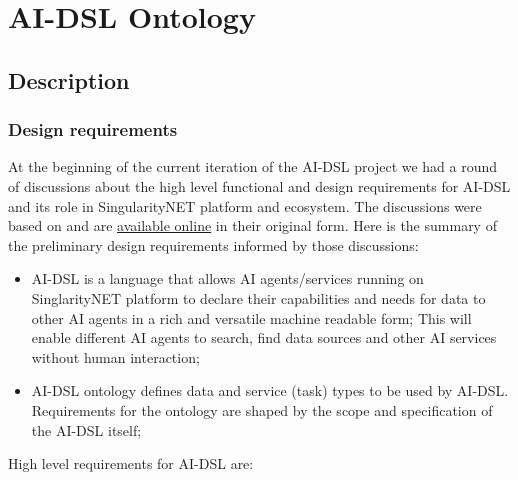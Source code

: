 \documentclass[]{report}
\begin{document}
\chapter{AI-DSL Ontology}
\label{chap:aidsl_ontology}

\section{Description}

\subsection{Design requirements}
\label{sec:design-requirements}

At the beginning of the current iteration of the AI-DSL project we had a round
of discussions about the high level functional and design requirements for
AI-DSL and its role in SingularityNET platform and ecosystem. The discussions
were based on
\cite{GoertzelGeisweillerBlog,singularitynet_foundation_phasetwo_2021}  and are
\href{https://github.com/nunet-io/ai-dsl-ontology/wiki/AI-DSL\%20requirements}{available
online} in their original form. Here is the summary of the preliminary design
requirements informed by those discussions:

\begin{itemize} \item AI-DSL is a language that allows AI agents/services
running on SinglarityNET platform to declare their capabilities and needs for
data to other AI agents in a rich and versatile machine readable form; This will
enable different AI agents to search, find data sources and other AI services
without human interaction; \item AI-DSL ontology defines data and service
(task) types to be used by AI-DSL. Requirements for the ontology are shaped by
the scope and specification of the AI-DSL itself; \end{itemize}

High level requirements for AI-DSL are:
\end{document}
